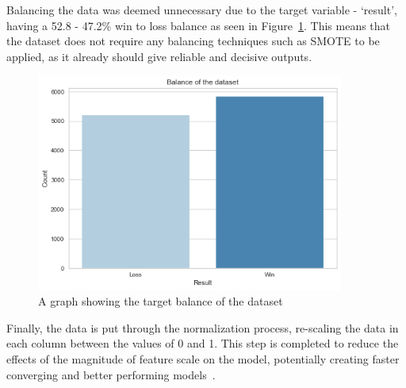 Balancing the data was deemed unnecessary due to the target variable - `result', having a 52.8 - 47.2\% win to loss balance as seen in Figure~\ref{fig:DataBalance}.
This means that the dataset does not require any balancing techniques such as SMOTE to be applied, as it already should give reliable and decisive outputs.

\begin{figure}[h!]
    \centering
    \includegraphics[width=0.9\textwidth]{figures/DataBalance}
    \caption{A graph showing the target balance of the dataset}
    \label{fig:DataBalance}
\end{figure}

Finally, the data is put through the normalization process, re-scaling the data in each column between the values of 0 and 1.
This step is completed to reduce the effects of the magnitude of feature scale on the model, potentially creating faster converging and better performing models~\citep{normalizePython}.

